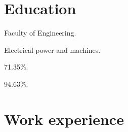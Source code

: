 \documentclass[10pt]{extarticle}
\begin{document}
\section{Education}

\begin{cusbox}[title = {Mansoura University\hfill [2013 - 2019]}]
\begin{description}[nosep]
	\item[Faculty:] Faculty of Engineering. 
	\item[Department:] Electrical power and machines. 
	\item[Grade:] 71.35\%. 
\end{description}
\end{cusbox}

\begin{cusbox}[title = {Kum Al-Nur Secondary school (for boys) \hfill [2010 - 2013]}]
\begin{description}[nosep]
	\item[Grade:] 94.63\%. 
\end{description}
\end{cusbox}


\section{Work experience}
\end{document}
